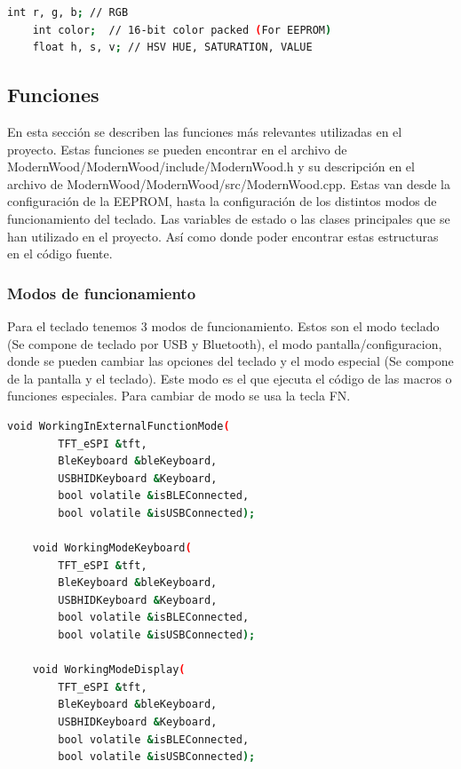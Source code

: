 \begin{lstlisting}[style=console, language=bash, caption={Definicion de los 3 datos que maneja la clase RGB}, label={code:RGBClass}]
    int r, g, b; // RGB
    int color;  // 16-bit color packed (For EEPROM)
    float h, s, v; // HSV HUE, SATURATION, VALUE
\end{lstlisting}

\subsection{Funciones}\label{ApendiceFunciones}

En esta sección se describen las funciones más relevantes utilizadas en el proyecto. Estas funciones se pueden encontrar en el archivo de ModernWood/ModernWood/include/ModernWood.h y su descripción en el archivo de ModernWood/ModernWood/src/ModernWood.cpp. Estas van desde la configuración de la \gls{EEPROM}, hasta la configuración de los distintos modos de funcionamiento del teclado. Las variables de estado o las clases principales que se han utilizado en el proyecto. Así como donde poder encontrar estas estructuras en el código fuente.

\subsubsection{Modos de funcionamiento}
Para el teclado tenemos 3 modos de funcionamiento. Estos son el modo teclado (Se compone de teclado por \gls{USB} y \gls{Bluetooth}), el modo pantalla/configuracion, donde se pueden cambiar las opciones del teclado y el modo especial (Se compone de la pantalla y el teclado). Este modo es el que ejecuta el código de las macros o funciones especiales. Para cambiar de modo se usa la tecla FN.

\begin{lstlisting}[style=console, language=bash, caption={Funciones principales del teclado ModernWood}, label={code:ConfigStruct}]
    void WorkingInExternalFunctionMode(
        TFT_eSPI &tft,
        BleKeyboard &bleKeyboard,
        USBHIDKeyboard &Keyboard, 
        bool volatile &isBLEConnected, 
        bool volatile &isUSBConnected);

    void WorkingModeKeyboard(
        TFT_eSPI &tft, 
        BleKeyboard &bleKeyboard, 
        USBHIDKeyboard &Keyboard, 
        bool volatile &isBLEConnected, 
        bool volatile &isUSBConnected);
    
    void WorkingModeDisplay(
        TFT_eSPI &tft, 
        BleKeyboard &bleKeyboard, 
        USBHIDKeyboard &Keyboard, 
        bool volatile &isBLEConnected, 
        bool volatile &isUSBConnected);
\end{lstlisting}

